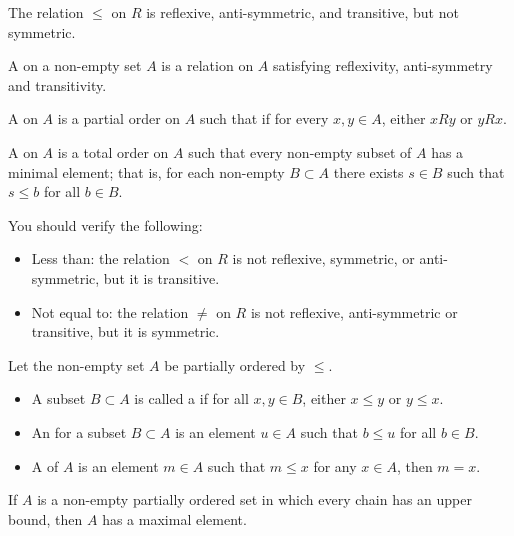 \begin{example}
The relation $\le$ on $R$ is reflexive, anti-symmetric, and transitive, but not symmetric. 
\end{example}

\begin{definition}
A  on a non-empty set $A$ is a relation on $A$ satisfying reflexivity, anti-symmetry and transitivity.

A  on $A$ is a partial order on $A$ such that if for every $x,y\in A$, either $xRy$ or $yRx$.

A  on $A$ is a total order on $A$ such that every non-empty subset of $A$ has a minimal element; that is, for each non-empty $B\subset A$ there exists $s\in B$ such that $s\le b$ for all $b\in B$.
\end{definition}

\begin{example}
You should verify the following:
\begin{itemize}
\item Less than: the relation $<$ on $R$ is not reflexive, symmetric, or anti-symmetric, but it is transitive.
\item Not equal to: the relation $\neq$ on $R$ is not reflexive, anti-symmetric or transitive, but it is symmetric.
\end{itemize}
\end{example}

\begin{definition}
Let the non-empty set $A$ be partially ordered by $\le$.
\begin{itemize}
\item A subset $B\subset A$ is called a  if for all $x,y\in B$, either $x\le y$ or $y\le x$.
\item An  for a subset $B\subset A$ is an element $u\in A$ such that $b\le u$ for all $b\in B$.
\item A  of $A$ is an element $m\in A$ such that $m\le x$ for any $x\in A$, then $m=x$.
\end{itemize}
\end{definition}

\begin{lemma}
If $A$ is a non-empty partially ordered set in which every chain has an upper bound, then $A$ has a maximal element.
\end{lemma}

